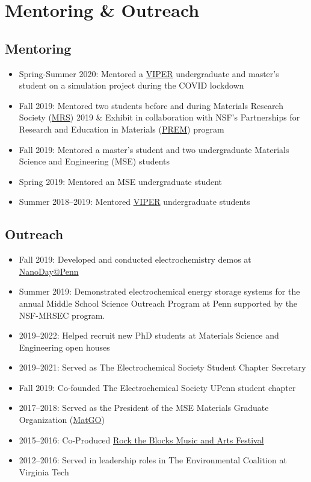 \documentclass[11pt]{article} %
\begin{document}
\section{Mentoring \& Outreach}
\subsection{Mentoring}
\begin{itemize}
  \item Spring-Summer 2020: Mentored a \href{https://www.viper.upenn.edu/}{VIPER} undergraduate and master's student on a simulation project during the COVID lockdown
  \item Fall 2019: Mentored two students before and during Materials Research Society (\href{https://www.mrs.org/}{MRS}) 2019 \& Exhibit in collaboration with NSF's Partnerships for Research and Education in Materials (\href{https://new.nsf.gov/funding/opportunities/prem-partnerships-research-education-materials}{PREM}) program
  \item Fall 2019: Mentored a master's student and two undergraduate Materials Science and Engineering (MSE) students
  \item Spring 2019: Mentored an MSE undergraduate student
  \item Summer 2018--2019: Mentored \href{https://www.viper.upenn.edu/}{VIPER} undergraduate students
\end{itemize}

\subsection{Outreach}
\begin{itemize}
  \item Fall 2019: Developed and conducted electrochemistry demos at \href{https://www.nano.upenn.edu/nanoday/}{NanoDay@Penn}
  \item Summer 2019: Demonstrated electrochemical energy storage systems for the annual Middle School Science Outreach Program at Penn supported by the NSF-MRSEC program.
  \item 2019--2022: Helped recruit new PhD students at Materials Science and Engineering open houses
  \item 2019--2021: Served as The Electrochemical Society Student Chapter Secretary
  \item Fall 2019: Co-founded The Electrochemical Society UPenn student chapter
  \item 2017--2018: Served as the President of the MSE Materials Graduate Organization (\href{https://mse.seas.upenn.edu/graduate-groups-resources/}{MatGO})
  \item 2015--2016: Co-Produced \href{https://www.facebook.com/rocktheblocks/}{Rock the Blocks Music and Arts Festival}
  \item 2012--2016: Served in leadership roles in The Environmental Coalition at Virginia Tech
\end{itemize}
\end{document}
